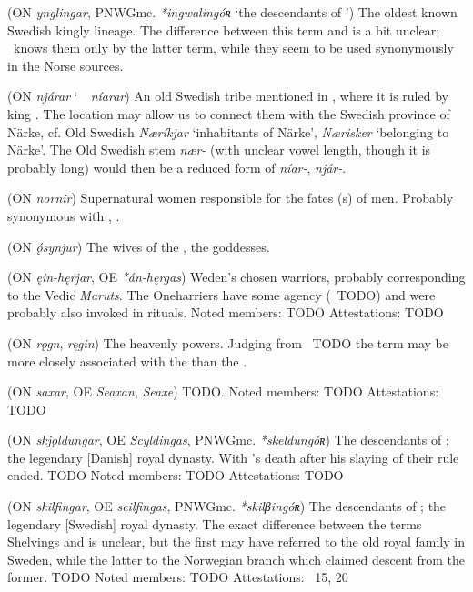 \begin{itemize}
 (ON \emph{ynglingar}, PNWGmc. \emph{*ingwalingóʀ} ‘the descendants of ’)
  The oldest known Swedish kingly lineage. The difference between this term and  is a bit unclear; \Beowulf\ knows them only by the latter term, while they seem to be used synonymously in the Norse sources.

 (ON \emph{njárar} \char`~\ \emph{níarar})
  An old Swedish tribe mentioned in \Volundarkvida, where it is ruled by king .  The location may allow us to connect them with the Swedish province of Närke, cf. Old Swedish \emph{Næríkjar} ‘inhabitants of Närke’, \emph{Nærisker} ‘belonging to Närke’.  The Old Swedish stem \emph{nær-} (with unclear vowel length, though it is probably long) would then be a reduced form of \emph{níar-}, \emph{njár-}.

 (ON \emph{nornir})
  Supernatural women responsible for the fates (s) of men.  Probably synonymous with , .

 (ON \emph{ǫ́synjur})
  The wives of the , the goddesses.

 (ON \emph{ęin-hęrjar}, OE \emph{*án-hęrgas})
  Weden’s chosen warriors, probably corresponding to the Vedic \emph{Maruts}.  The Oneharriers have some agency (\Grimnismal\ TODO) and were probably also invoked in rituals.
  Noted members: TODO
  Attestations: TODO

 (ON \emph{rǫgn}, \emph{ręgin})
  The heavenly powers.  Judging from \Vafthrudnismal\ TODO the term may be more closely associated with the  than the .

 (ON \emph{saxar}, OE \emph{Seaxan}, \emph{Seaxe})
  TODO.
  Noted members: TODO
  Attestations: TODO

 (ON \emph{skjǫldungar}, OE \emph{Scyldingas}, PNWGmc. \emph{*skeldungóʀ})
  The descendants of ; the legendary [Danish] royal dynasty. With ’s death after his slaying of  their rule ended. TODO
  Noted members: TODO
  Attestations: TODO

 (ON \emph{skilfingar}, OE \emph{scilfingas}, PNWGmc. \emph{*skilβingóʀ})
  The descendants of ; the legendary [Swedish] royal dynasty. The exact difference between the terms Shelvings and  is unclear, but the first may have referred to the old royal family in Sweden, while the latter to the Norwegian branch which claimed descent from the former. TODO
  Noted members: TODO
  Attestations: \Hyndluljod\ 15, 20


\end{itemize}
